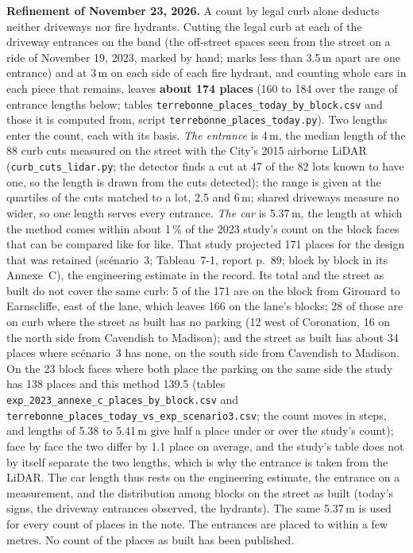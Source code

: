 \documentclass[11pt,a4paper]{article}
\begin{document}
\textbf{Refinement of November 23, 2026.} A count by legal curb alone deducts neither driveways nor fire hydrants. Cutting the legal curb at each of the driveway entrances on the band (the off-street spaces seen from the street on a ride of November 19, 2023, marked by hand; marks less than 3.5\,m apart are one entrance) and at 3\,m on each side of each fire hydrant, and counting whole cars in each piece that remains, leaves \textbf{about 174 places} (160 to 184 over the range of entrance lengths below; tables \texttt{terrebonne\_places\_today\_by\_block.csv} and those it is computed from, script \texttt{terrebonne\_places\_today.py}). Two lengths enter the count, each with its basis. \emph{The entrance} is 4\,m, the median length of the 88 curb cuts measured on the street with the City\textquoteright{}s 2015 airborne LiDAR (\texttt{curb\_cuts\_lidar.py}; the detector finds a cut at 47 of the 82 lots known to have one, so the length is drawn from the cuts detected); the range is given at the quartiles of the cuts matched to a lot, 2.5 and 6\,m; shared driveways measure no wider, so one length serves every entrance. \emph{The car} is 5.37\,m, the length at which the method comes within about 1\,\% of the 2023 study\textquoteright{}s count on the block faces that can be compared like for like. That study projected 171 places for the design that was retained (sc\'enario~3; Tableau~7-1, report p.~89; block by block in its Annexe~C), the engineering estimate in the record. Its total and the street as built do not cover the same curb: 5 of the 171 are on the block from Girouard to Earnscliffe, east of the lane, which leaves 166 on the lane\textquoteright{}s blocks; 28 of those are on curb where the street as built has no parking (12 west of Coronation, 16 on the north side from Cavendish to Madison); and the street as built has about 34 places where sc\'enario~3 has none, on the south side from Cavendish to Madison. On the 23 block faces where both place the parking on the same side the study has 138 places and this method 139.5 (tables \texttt{exp\_2023\_annexe\_c\_places\_by\_block.csv} and \texttt{terrebonne\_places\_today\_vs\_exp\_scenario3.csv}; the count moves in steps, and lengths of 5.38 to 5.41\,m give half a place under or over the study\textquoteright{}s count); face by face the two differ by 1.1 place on average, and the study\textquoteright{}s table does not by itself separate the two lengths, which is why the entrance is taken from the LiDAR. The car length thus rests on the engineering estimate, the entrance on a measurement, and the distribution among blocks on the street as built (today\textquoteright{}s signs, the driveway entrances observed, the hydrants). The same 5.37\,m is used for every count of places in the note. The entrances are placed to within a few metres. No count of the places as built has been published.
\end{document}
